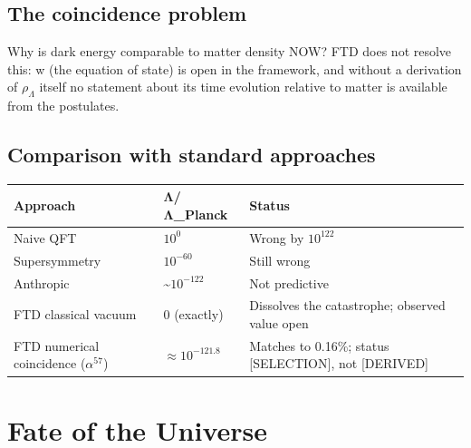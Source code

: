 \documentclass[
  11pt,
  letterpaper,
  twoside,
  openright]{book}
\begin{document}
\subsection{The coincidence problem}\label{the-coincidence-problem}

Why is dark energy comparable to matter density NOW? FTD does not
resolve this: w (the equation of state) is open in the framework, and
without a derivation of \(\rho_\Lambda\) itself no statement about its
time evolution relative to matter is available from the postulates.

\subsection{Comparison with standard
approaches}\label{comparison-with-standard-approaches}

\begin{longtable}[]{@{}
  >{\raggedright\arraybackslash}p{}
  >{\raggedright\arraybackslash}p{}
  >{\raggedright\arraybackslash}p{}@{}}
\toprule\noalign{}
\begin{minipage}[b]{\linewidth}\raggedright
Approach
\end{minipage} & \begin{minipage}[b]{\linewidth}\raggedright
Λ/Λ\_Planck
\end{minipage} & \begin{minipage}[b]{\linewidth}\raggedright
Status
\end{minipage} \\
\midrule\noalign{}
\endhead
\bottomrule\noalign{}
\endlastfoot
Naive QFT & \(10^0\) & Wrong by \(10^{122}\) \\
Supersymmetry & \(10^{-60}\) & Still wrong \\
Anthropic & \textasciitilde{}\(10^{-122}\) & Not predictive \\
FTD classical vacuum & \(0\) (exactly) & Dissolves the catastrophe;
observed value open \\
FTD numerical coincidence (\(\alpha^{57}\)) & \(\approx 10^{-121.8}\) &
Matches to 0.16\%; status {[}SELECTION{]}, not {[}DERIVED{]} \\
\end{longtable}

\section{Fate of the Universe}\label{fate-of-the-universe}
\end{document}
